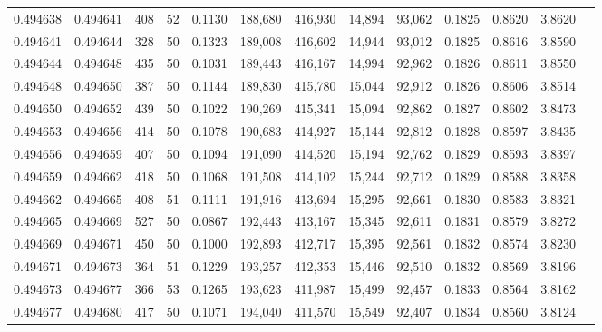 \begin{tabular}{rrrrrrrrrrrrr}
0.494638 & 0.494641 &   408 &  52 &                                     0.1130 & 188,680 & 416,930 &  14,894 &  93,062 & 0.1825 & 0.8620 & 3.8620 \\
0.494641 & 0.494644 &   328 &  50 &                                     0.1323 & 189,008 & 416,602 &  14,944 &  93,012 & 0.1825 & 0.8616 & 3.8590 \\
0.494644 & 0.494648 &   435 &  50 &                                     0.1031 & 189,443 & 416,167 &  14,994 &  92,962 & 0.1826 & 0.8611 & 3.8550 \\
0.494648 & 0.494650 &   387 &  50 &                                     0.1144 & 189,830 & 415,780 &  15,044 &  92,912 & 0.1826 & 0.8606 & 3.8514 \\
0.494650 & 0.494652 &   439 &  50 &                                     0.1022 & 190,269 & 415,341 &  15,094 &  92,862 & 0.1827 & 0.8602 & 3.8473 \\
0.494653 & 0.494656 &   414 &  50 &                                     0.1078 & 190,683 & 414,927 &  15,144 &  92,812 & 0.1828 & 0.8597 & 3.8435 \\
0.494656 & 0.494659 &   407 &  50 &                                     0.1094 & 191,090 & 414,520 &  15,194 &  92,762 & 0.1829 & 0.8593 & 3.8397 \\
0.494659 & 0.494662 &   418 &  50 &                                     0.1068 & 191,508 & 414,102 &  15,244 &  92,712 & 0.1829 & 0.8588 & 3.8358 \\
0.494662 & 0.494665 &   408 &  51 &                                     0.1111 & 191,916 & 413,694 &  15,295 &  92,661 & 0.1830 & 0.8583 & 3.8321 \\
0.494665 & 0.494669 &   527 &  50 &                                     0.0867 & 192,443 & 413,167 &  15,345 &  92,611 & 0.1831 & 0.8579 & 3.8272 \\
0.494669 & 0.494671 &   450 &  50 &                                     0.1000 & 192,893 & 412,717 &  15,395 &  92,561 & 0.1832 & 0.8574 & 3.8230 \\
0.494671 & 0.494673 &   364 &  51 &                                     0.1229 & 193,257 & 412,353 &  15,446 &  92,510 & 0.1832 & 0.8569 & 3.8196 \\
0.494673 & 0.494677 &   366 &  53 &                                     0.1265 & 193,623 & 411,987 &  15,499 &  92,457 & 0.1833 & 0.8564 & 3.8162 \\
0.494677 & 0.494680 &   417 &  50 &                                     0.1071 & 194,040 & 411,570 &  15,549 &  92,407 & 0.1834 & 0.8560 & 3.8124 \\

\end{tabular}
